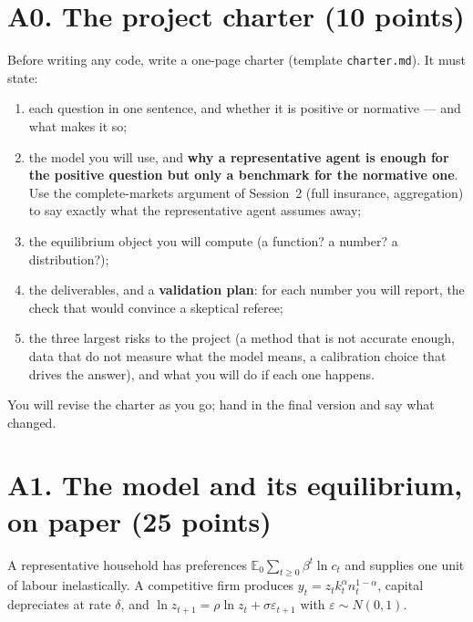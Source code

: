 \documentclass[11pt]{article}
\newif\ifsolutions \solutionsfalse
\newcommand{\solution}[1]{\ifsolutions\medskip
  {\color{blue!45!black}\textbf{Solution.} #1}\medskip\fi}
\begin{document}
\section*{A0. The project charter (10 points)}

Before writing any code, write a one-page charter (template \texttt{charter.md}). It must state:
\begin{enumerate}[label=(\alph*), leftmargin=*]
  \item each question in one sentence, and whether it is positive or normative --- and what
        makes it so;
  \item the model you will use, and \textbf{why a representative agent is enough for the positive
        question but only a benchmark for the normative one}. Use the complete-markets argument of
        Session~2 (full insurance, aggregation) to say exactly what the representative agent
        assumes away;
  \item the equilibrium object you will compute (a function? a number? a distribution?);
  \item the deliverables, and a \textbf{validation plan}: for each number you will report, the
        check that would convince a skeptical referee;
  \item the three largest risks to the project (a method that is not accurate enough, data that
        do not measure what the model means, a calibration choice that drives the answer), and
        what you will do if each one happens.
\end{enumerate}
You will revise the charter as you go; hand in the final version and say what changed.

\solution{\keyAzero}

\section*{A1. The model and its equilibrium, on paper (25 points)}

A representative household has preferences $\mathbb{E}_0\sum_{t\ge0}\beta^t\ln c_t$ and supplies
one unit of labour inelastically. A competitive firm produces $y_t=z_tk_t^{\alpha}n_t^{1-\alpha}$,
capital depreciates at rate $\delta$, and $\ln z_{t+1}=\rho\ln z_t+\sigma\varepsilon_{t+1}$ with
$\varepsilon\sim N(0,1)$.
\end{document}
